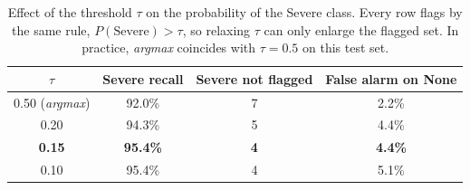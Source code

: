 \begin{table}[!t]
\centering
\caption{Effect of the threshold $\tau$ on the probability of the Severe class. Every row flags by the same rule, $P(\text{Severe}) > \tau$, so relaxing $\tau$ can only enlarge the flagged set. In practice, \emph{argmax} coincides with $\tau = 0.5$ on this test set.}
\label{tab:limiar}
\begin{tabular}{cccc}
\toprule
$\tau$ & Severe recall & Severe not flagged & False alarm on None \\
\midrule
0.50 (\emph{argmax}) & 92.0\% & 7 & 2.2\% \\
0.20 & 94.3\% & 5 & 4.4\% \\
\textbf{0.15} & \textbf{95.4\%} & \textbf{4} & \textbf{4.4\%} \\
0.10 & 95.4\% & 4 & 5.1\% \\
\bottomrule
\end{tabular}
\end{table}
